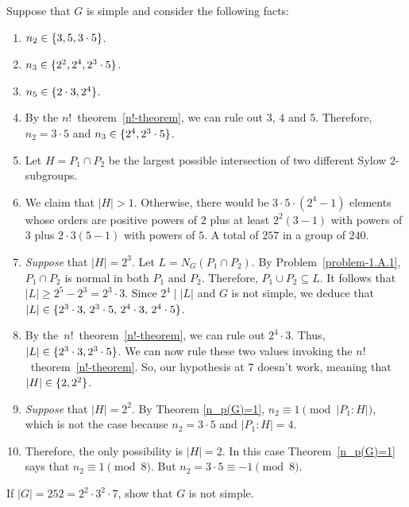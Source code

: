 \begin{solution} Suppose that $G$ is simple and consider the following facts:
\begin{enumerate}[\upshape1.]
    \item $n_2\in\{3,5,3\cdot5\}$.
    \item $n_3\in\{2^2,2^4,2^3\cdot5\}$.
    \item $n_5\in\{2\cdot3,2^4\}$.
    \item By the $n!$~theorem~\ref{n!-theorem}, we can rule out $3$, $4$ and $5$. Therefore, $n_2=3\cdot5$ and $n_3\in\{2^4,2^3\cdot5\}$.
    \item Let $H=P_1\cap P_2$ be the largest possible intersection of two different Sylow $2$-subgroups.
    \item We claim that $|H|>1$. Otherwise, there would be $3\cdot5\cdot(2^4-1)$ elements whose orders are positive powers of $2$ plus at least $2^2(3-1)$ with powers of $3$ plus $2\cdot3(5-1)$ with powers of $5$. A total of $257$ in a group of $240$.
    \item {\it Suppose\/} that $|H|=2^3$. Let $L=N_G(P_1\cap P_2)$. By Problem~\ref{problem-1.A.1}, $P_1\cap P_2$ is normal in both $P_1$  and $P_2$. Therefore, $P_1\cup P_2\subseteq L$. It follows that $|L|\ge 2^5-2^3=2^3\cdot3$. Since $2^4\mid|L|$ and $G$ is not simple, we deduce that $|L|\in\{2^3\cdot3,\,2^3\cdot5,\,2^4\cdot3,\,2^4\cdot5\}$.
    \item By the~$n!$~theorem~\ref{n!-theorem}, we can rule out $2^4\cdot3$. Thus, $|L|\in\{2^3\cdot3,2^3\cdot5\}$. We can now rule these two values invoking the $n!$~theorem~\ref{n!-theorem}. So, our hypothesis at 7 doesn't work, meaning that $|H|\in\{2,2^2\}$.
    \item {\it Suppose\/} that $|H|=2^2$. By Theorem \ref{n_p(G)=1}, $n_2\equiv1\pmod{|P_1:H|}$, which is not the case because $n_2=3\cdot5$ and $|P_1:H|=4$.
    \item Therefore, the only possibility is $|H|=2$. In this case Theorem~\ref{n_p(G)=1} says that $n_2\equiv1\pmod8$. But $n_2=3\cdot5\equiv-1\pmod8$.
\end{enumerate}
\end{solution}

\begin{probl}
    If\/ $|G|=252=2^2\cdot3^2\cdot7$, show that\/ $G$ is not simple.
\end{probl}


